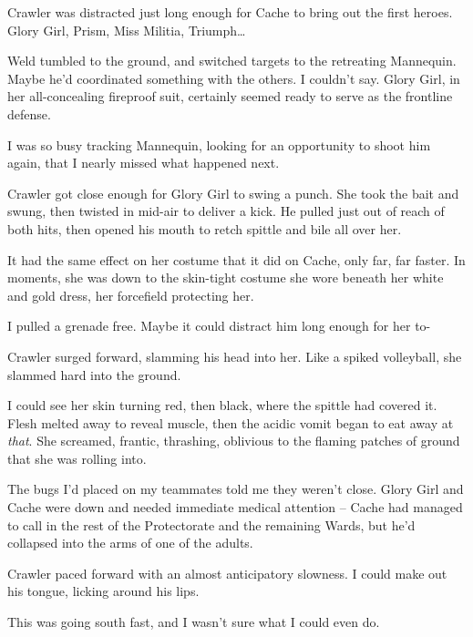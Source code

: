 Crawler was distracted just long enough for Cache to bring out the first heroes.  Glory Girl, Prism, Miss Militia, Triumph\ldots



Weld tumbled to the ground, and switched targets to the retreating Mannequin.  Maybe he'd coordinated something with the others.  I couldn't say.  Glory Girl, in her all-concealing fireproof suit, certainly seemed ready to serve as the frontline defense.



I was so busy tracking Mannequin, looking for an opportunity to shoot him again, that I nearly missed what happened next.



Crawler got close enough for Glory Girl to swing a punch.  She took the bait and swung, then twisted in mid-air to deliver a kick.  He pulled just out of reach of both hits, then opened his mouth to retch spittle and bile all over her.



It had the same effect on her costume that it did on Cache, only far, far faster.  In moments, she was down to the skin-tight costume she wore beneath her white and gold dress, her forcefield protecting her.



I pulled a grenade free.  Maybe it could distract him long enough for her to-



Crawler surged forward, slamming his head into her.  Like a spiked volleyball, she slammed hard into the ground.



I could see her skin turning red, then black, where the spittle had covered it.  Flesh melted away to reveal muscle, then the acidic vomit began to eat away at \emph{that}.  She screamed, frantic, thrashing, oblivious to the flaming patches of ground that she was rolling into.



The bugs I'd placed on my teammates told me they weren't close.  Glory Girl and Cache were down and needed immediate medical attention – Cache had managed to call in the rest of the Protectorate and the remaining Wards, but he'd collapsed into the arms of one of the adults.



Crawler paced forward with an almost anticipatory slowness.  I could make out his tongue, licking around his lips.



This was going south fast, and I wasn't sure what I could even do.





